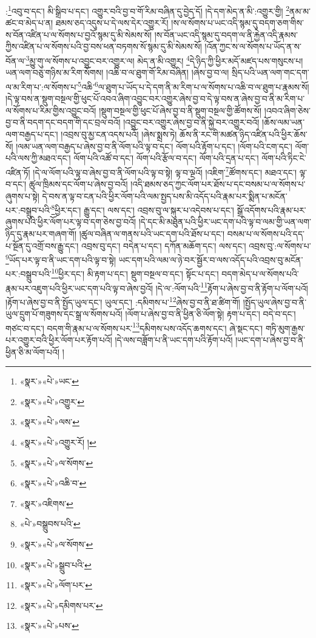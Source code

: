 :\footnote{«སྣར་»«པེ་»ཡང་}འབུ་བ་དང་། མི་སྒྲིབ་པ་དང་། འགྱུར་བའི་བྱ་བ་གོ་རིམ་བཞིན་དུ་བྱེད་དོ། །དེ་དག་མེད་ན་མི་:འགྱུར་གྱི། \footnote{«སྣར་»«པེ་»འགྱུར་}ནམ་མ་ཚང་བ་མེད་པ་ན། ཐམས་ཅད་འདུས་པ་དེ་ལས་དེར་འགྱུར་རོ། །ས་ལ་སོགས་པ་ཡང་འདི་སྙམ་དུ་བདག་ཅག་གིས་ས་བོན་འཛིན་པ་ལ་སོགས་པ་བྱའོ་སྙམ་དུ་མི་སེམས་སོ། །ས་བོན་ཡང་འདི་སྙམ་དུ་བདག་ལ་ནི་རྐྱེན་འདི་རྣམས་ཀྱིས་འཛིན་པ་ལ་སོགས་པའི་བྱ་བས་ཕན་བཏགས་སོ་སྙམ་དུ་མི་སེམས་སོ། །འོན་ཀྱང་ས་ལ་སོགས་པ་ཡོད་ན་ས་བོན་ལ་\footnote{«སྣར་»«པེ་»ལས་}མྱུ་གུ་ལ་སོགས་པ་འབྱུང་བར་འགྱུར་ལ། མེད་ན་མི་འགྱུར། \footnote{«སྣར་»«པེ་»འགྱུར་རོ། ། }དེ་ཉིད་ཀྱི་ཕྱིར་མདོ་མཛད་པས་གསུངས་པ། ཡན་ལག་བཅུ་གཉིས་མ་རིག་སོགས། །འཆི་བ་ལ་ཐུག་གོ་རིམ་བཞིན། །ཞེས་བྱ་བ་ལ། སྲིད་པའི་ཡན་ལག་གང་དག་ལ་མ་རིག་པ་:ལ་སོགས་པ་\footnote{«སྣར་»«པེ་»ལ་སོགས་}འཆི་\footnote{«སྣར་»«པེ་»འཆི་བ་}ལ་ཐུག་པ་ཡོད་པ་དེ་དག་ནི་མ་རིག་པ་ལ་སོགས་པ་འཆི་བ་ལ་ཐུག་པ་རྣམས་སོ། །དེ་ལྟ་བས་ན་སྡུག་བསྔལ་གྱི་ཕུང་པོ་འབའ་ཞིག་འབྱུང་བར་འགྱུར་ཞེས་བྱ་བ་དེ་ལྟ་བས་ན་ཞེས་བྱ་བ་ནི་མ་རིག་པ་ལ་སོགས་པ་རིམ་གྱིས་འབྱུང་བའོ། །སྡུག་བསྔལ་གྱི་ཕུང་པོ་ཞེས་བྱ་བ་ནི་སྡུག་བསྔལ་གྱི་ཚོགས་སོ། །འབའ་ཞིག་ཅེས་བྱ་བ་ནི་བདག་དང་བདག་གི་དང་བྲལ་བའོ། །འབྱུང་བར་འགྱུར་ཞེས་བྱ་བ་ནི་སྐྱེ་བར་འགྱུར་བའོ། །ཆོས་ལམ་ཡན་ལག་བརྒྱད་པ་དང་། །འབྲས་བུ་མྱ་ངན་འདས་པའོ། །ཞེས་སྨྲས་ཏེ། ཆོས་ནི་རང་གི་མཚན་ཉིད་འཛིན་པའི་ཕྱིར་ཆོས་སོ། །ལམ་ཡན་ལག་བརྒྱད་པ་ཞེས་བྱ་བ་ནི་ལོག་པའི་ལྟ་བ་དང་། ལོག་པའི་རྟོག་པ་དང་། །ལོག་པའི་ངག་དང་། ལོག་པའི་ལས་ཀྱི་མཐའ་དང་། ལོག་པའི་འཚོ་བ་དང་། ལོག་པའི་རྩོལ་བ་དང་། ལོག་པའི་དྲན་པ་དང་། ལོག་པའི་ཏིང་ངེ་འཛིན་ཏོ། །དེ་ལ་ལོག་པའི་ལྟ་བ་ཞེས་བྱ་བ་ནི་ལོག་པའི་ལྟ་བ་སྟེ། ལྟ་བ་ལྔའོ། །འཇིག་\footnote{«སྣར་»འཇིགས་}ཚོགས་དང་། མཐའ་དང་། ལྟ་བ་དང་། ཚུལ་ཁྲིམས་དང་ལོག་པ་ཞེས་བྱ་བའོ། །འདི་ཐམས་ཅད་ཀྱང་ལོག་པར་ཐོས་པ་དང་བསམ་པ་ལ་སོགས་པ་ཞུགས་པ་སྟེ། དེ་བས་ན་ལྟ་བ་ངན་པའི་ཕྱིར་ལོག་པའི་ལམ་སྤྱད་པས་མི་འདོད་པའི་རྣམ་པར་སྨིན་པ་མངོན་པར་:བསྒྲུབ་པའི་\footnote{«པེ་»བསྒྲུབས་པའི་}ཕྱིར་དང་། རྒྱུ་དང་། ལས་དང་། འབྲས་བུ་ལ་སྐུར་པ་འདེབས་པ་དང་། སྒྲོ་འདོགས་པའི་རྣམ་པར་ཞུགས་པའི་ཕྱིར་ལོག་པར་ལྟ་བ་དག་ཅེས་བྱ་བའོ། །དེ་དང་མི་མཐུན་པའི་ཕྱིར་ཡང་དག་པའི་ལྟ་བ་ལམ་གྱི་ཡན་ལག་ཉིད་དུ་རྣམ་པར་གཞག་གོ། །ཚུལ་བཞིན་ལ་གནས་པའི་ཡང་དག་པའི་ཐོས་པ་དང་། བསམ་པ་ལ་སོགས་པའི་དད་པ་སྔོན་དུ་འགྲོ་བས་རྒྱུ་དང་། འབྲས་བུ་དང་། བདེན་པ་དང་། དཀོན་མཆོག་དང་། ལས་དང་། འབྲས་བུ་:ལ་སོགས་པ་\footnote{«སྣར་»«པེ་»ལ་སོགས་}ཡོད་པར་ལྟ་བ་ནི་ཡང་དག་པའི་ལྟ་བ་སྟེ། ཡང་དག་པའི་ལམ་ལ་ཉེ་བར་སྦྱོར་བ་ལས་འདོད་པའི་འབྲས་བུ་མངོན་པར་:བསྒྲུབ་པའི་\footnote{«སྣར་»«པེ་»སྒྲུབ་པའི་}ཕྱིར་དང་། མི་རྟག་པ་དང་། སྡུག་བསྔལ་བ་དང་། སྟོང་པ་དང་། བདག་མེད་པ་ལ་སོགས་པའི་རྣམ་པར་འཇུག་པའི་ཕྱིར་ཡང་དག་པའི་ལྟ་བ་ཞེས་བྱའོ། །དེ་ལ་:ལོག་པའི་\footnote{«སྣར་»«པེ་»ལོག་པར་}རྟོག་པ་ཞེས་བྱ་བ་ནི་རྟོག་པ་ལོག་པའོ། །རྟོག་པ་ཞེས་བྱ་བ་ནི་སྤྱོད་ཡུལ་དང་། ཡུལ་དང་། :དམིགས་པ་\footnote{«སྣར་»«པེ་»དམིགས་པར་}ཞེས་བྱ་བ་ནི་ཐ་ཚིག་གོ། །སྤྱོད་ཡུལ་ཞེས་བྱ་བ་ནི་ཡུལ་དྲུག་པོ་གཟུགས་དང་སྒྲ་ལ་སོགས་པའོ། །ལོག་པ་ཞེས་བྱ་བ་ནི་ཕྱིན་ཅི་ལོག་སྟེ། རྟག་པ་དང་། བདེ་བ་དང་། གཙང་བ་དང་། བདག་གི་རྣམ་པ་ལ་སོགས་པར་\footnote{«སྣར་»«པེ་»པས་}དམིགས་པས་འདོད་ཆགས་དང་། ཞེ་སྡང་དང་། གཏི་མུག་རྒྱས་པར་འགྱུར་བའི་ཕྱིར་ལོག་པར་རྟོག་པའོ། །དེ་ལས་བཟློག་པ་ནི་ཡང་དག་པའི་རྟོག་པའོ། །ཡང་དག་པ་ཞེས་བྱ་བ་ནི་ཕྱིན་ཅི་མ་ལོག་པའོ། །
